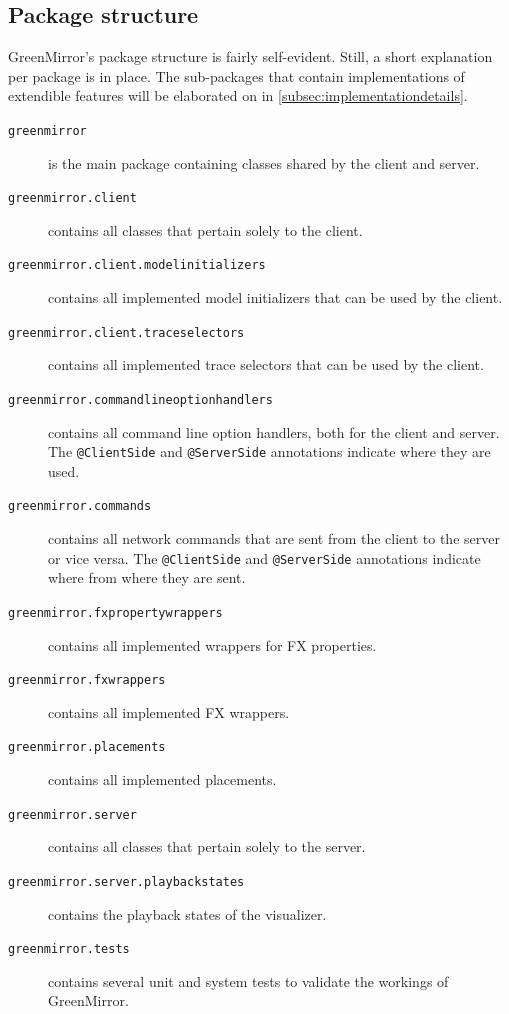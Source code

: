 \documentclass[a4paper]{article}
\begin{document}
\subsection{Package structure}
GreenMirror's package structure is fairly self-evident. Still, a short explanation per package is in place. The sub-packages that contain implementations of extendible features will be elaborated on in \cref{subsec:implementationdetails}. %
\begin{description}
\item[\texttt{greenmirror}] is the main package containing classes shared by the client and server.
\item[\texttt{greenmirror.client}] contains all classes that pertain solely to the client.
\item[\texttt{greenmirror.client.modelinitializers}] contains all implemented model initializers that can be used by the client.
\item[\texttt{greenmirror.client.traceselectors}] contains all implemented trace selectors that can be used by the client.
\item[\texttt{greenmirror.commandlineoptionhandlers}] contains all command line option handlers, both for the client and server. The \lstinline{@ClientSide} and \lstinline{@ServerSide} annotations indicate where they are used.
\item[\texttt{greenmirror.commands}] contains all network commands that are sent from the client to the server or vice versa. The \lstinline{@ClientSide} and \lstinline{@ServerSide} annotations indicate where from where they are sent.
\item[\texttt{greenmirror.fxpropertywrappers}] contains all implemented wrappers for FX properties.
\item[\texttt{greenmirror.fxwrappers}] contains all implemented FX wrappers.
\item[\texttt{greenmirror.placements}] contains all implemented placements.
\item[\texttt{greenmirror.server}] contains all classes that pertain solely to the server.
\item[\texttt{greenmirror.server.playbackstates}] contains the playback states of the visualizer.
\item[\texttt{greenmirror.tests}] contains several unit and system tests to validate the workings of GreenMirror.
\end{description}
\end{document}
